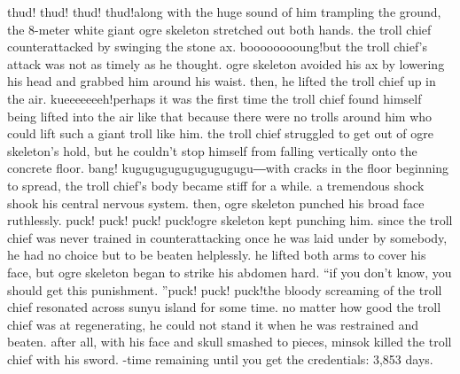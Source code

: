 thud! thud! thud! thud!along with the huge sound of him trampling the ground, the 8-meter white giant ogre skeleton stretched out both hands.
 the troll chief counterattacked by swinging the stone ax.
booooooooung!but the troll chief’s attack was not as timely as he thought.
 ogre skeleton avoided his ax by lowering his head and grabbed him around his waist.
 then, he lifted the troll chief up in the air.
kueeeeeeeh!perhaps it was the first time the troll chief found himself being lifted into the air like that because there were no trolls around him who could lift such a giant troll like him.
the troll chief struggled to get out of ogre skeleton’s hold, but he couldn’t stop himself from falling vertically onto the concrete floor.
bang! kugugugugugugugugugu―with cracks in the floor beginning to spread, the troll chief’s body became stiff for a while.
 a tremendous shock shook his central nervous system.
then, ogre skeleton punched his broad face ruthlessly.
puck! puck! puck! puck!ogre skeleton kept punching him.
 since the troll chief was never trained in counterattacking once he was laid under by somebody, he had no choice but to be beaten helplessly.
he lifted both arms to cover his face, but ogre skeleton began to strike his abdomen hard.
“if you don’t know, you should get this punishment.
”puck! puck! puck!the bloody screaming of the troll chief resonated across sunyu island for some time.
 no matter how good the troll chief was at regenerating, he could not stand it when he was restrained and beaten.
after all, with his face and skull smashed to pieces, minsok killed the troll chief with his sword.
-time remaining until you get the credentials: 3,853 days.


 